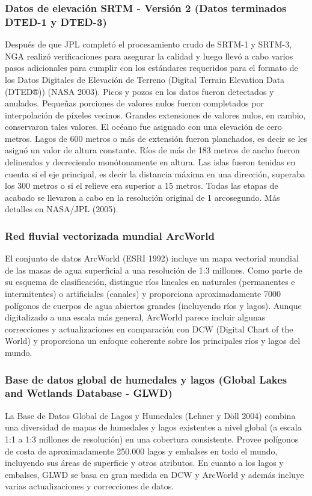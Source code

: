 \documentclass[10pt,a4paper, twoside]{report}
\begin{document}
\subsubsection{Datos de elevación SRTM - Versión 2 (Datos terminados DTED-1 y DTED-3)}
\label{SRTMDefincion}


Después de que JPL completó el procesamiento crudo de SRTM-1 y SRTM-3, NGA realizó verificaciones para asegurar la calidad y luego llevó a cabo varios pasos adicionales para cumplir con los estándares requeridos para el formato de los Datos Digitales de Elevación de Terreno (Digital Terrain Elevation Data (DTED®)) (NASA 2003). Picos y pozos en los datos fueron detectados y anulados. Pequeñas porciones de valores nulos fueron completados por interpolación de píxeles vecinos. Grandes extensiones de valores nulos, en cambio, conservaron tales valores. El océano fue asignado con una elevación de cero metros. Lagos de 600 metros o más de extensión fueron planchados, es decir se les asignó un valor de altura constante. Ríos de más de 183 metros de ancho fueron delineados y decreciendo monótonamente en altura. Las islas fueron tenidas en cuenta si el eje principal, es decir la distancia máxima en una dirección, superaba los 300 metros o si el relieve era superior a 15 metros. Todas las etapas de acabado se llevaron a cabo en la resolución original de 1 arcosegundo. Más detalles en NASA/JPL (2005).

\subsubsection{Red fluvial vectorizada mundial ArcWorld}
\label{ArcWorldLabel}

El conjunto de datos ArcWorld (ESRI 1992) incluye un mapa vectorial mundial de las masas de agua superficial a una resolución de 1:3 millones. Como parte de su esquema de clasificación, distingue ríos lineales en naturales (permanentes e intermitentes) o artificiales (canales) y proporciona aproximadamente 7000 polígonos de cuerpos de agua abiertos grandes (incluyendo ríos y lagos). Aunque digitalizado a una escala más general, ArcWorld parece incluir algunas correcciones y actualizaciones en comparación con DCW (Digital Chart of the World) y proporciona un enfoque coherente sobre los principales ríos y lagos del mundo.

\subsubsection{Base de datos global de humedales y lagos (Global Lakes and Wetlands Database - GLWD)}
\label{GLWDLabel}
La Base de Datos Global de Lagos y Humedales (Lehner y Döll 2004) combina una diversidad de mapas de humedales y lagos existentes a nivel global (a escala 1:1 a 1:3 millones de resolución) en una cobertura consistente. Provee polígonos de costa de aproximadamente 250.000 lagos y embalses en todo el mundo, incluyendo sus áreas de superficie y otros atributos. En cuanto a los lagos y embalses, GLWD se basa en gran medida en DCW y ArcWorld y además incluye varias actualizaciones y correcciones de datos.
\end{document}
